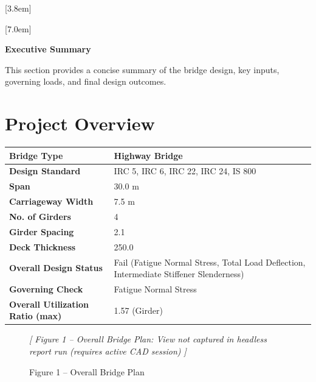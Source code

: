 \documentclass[12pt,a4paper]{report}
\numberwithin{table}{chapter}
\numberwithin{figure}{chapter}
\begin{document}
[3.8em]
  {\normalfont}
  {\contentslabel{2.3em}}
  {\hspace*{-2.3em}}
  {\hfill\contentspage}

[7.0em]
  {\normalfont}
  {\contentslabel{3.2em}}
  {\hspace*{-3.2em}}
  {\hfill\contentspage}

\newpage
\renewcommand{\contentsname}{\centering\Large\bfseries Table of Contents}
\tableofcontents


\newpage
{\centering\Large\bfseries Executive Summary\par}
\vspace{0.8em}

This section provides a concise summary of the bridge design, key inputs, governing loads, and final design outcomes.

\section*{Project Overview}
\label{sec:project-overview}


\begin{tabular}{|L{5.5cm}|L{8.5cm}|}
\hline
\textbf{Bridge Type} & Highway Bridge \\
\hline
\textbf{Design Standard} & IRC 5, IRC 6, IRC 22, IRC 24, IS 800 \\
\hline
\textbf{Span} & 30.0 m \\
\hline
\textbf{Carriageway Width} & 7.5 m \\
\hline
\textbf{No. of Girders} & 4 \\
\hline
\textbf{Girder Spacing} & 2.1 \\
\hline
\textbf{Deck Thickness} & 250.0 \\
\hline
\textbf{Overall Design Status} & Fail (Fatigue Normal Stress, Total Load Deflection, Intermediate Stiffener Slenderness) \\
\hline
\textbf{Governing Check} & Fatigue Normal Stress \\
\hline
\textbf{Overall Utilization Ratio (max)} & 1.57 (Girder) \\
\hline
\end{tabular}


\begin{figure}[H]
\centering
\vspace{6pt}
{\small\itshape [ Figure 1 -- Overall Bridge Plan: View not captured in headless report run (requires active CAD session) ]}
\vspace{6pt}
\caption*{Figure 1 -- Overall Bridge Plan}
\end{figure}
\end{document}
